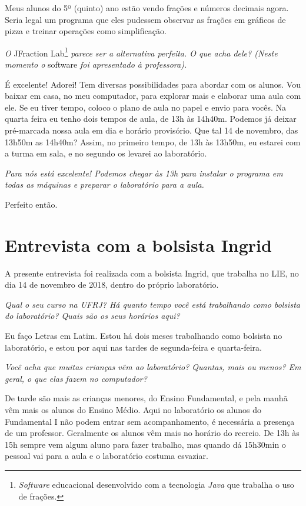 Meus alunos do 5º (quinto) ano estão vendo frações e números decimais agora. Seria legal um programa que eles pudessem observar as frações em gráficos de pizza e treinar operações como simplificação.

\textit{O} JFraction Lab\footnote{\textit{Software} educacional desenvolvido com a tecnologia \textit{Java} que trabalha o uso de frações.} \textit{parece ser a alternativa perfeita. O que acha dele? (Neste momento o} software \textit{foi apresentado à professora).}

É excelente! Adorei! Tem diversas possibilidades para abordar com os alunos. Vou baixar em casa, no meu computador, para explorar mais e elaborar uma aula com ele. Se eu tiver tempo, coloco o plano de aula no papel e envio para vocês. Na quarta feira eu tenho dois tempos de aula, de 13h às 14h40m. Podemos já deixar pré-marcada nossa aula em dia e horário provisório. Que tal 14 de novembro, das 13h50m as 14h40m? Assim, no primeiro tempo, de 13h às 13h50m, eu estarei com a turma em sala, e no segundo os levarei ao laboratório.

\textit{Para nós está excelente! Podemos chegar às 13h para instalar o programa em todas as máquinas e preparar o laboratório para a aula.}

Perfeito então.

\section{Entrevista com a bolsista Ingrid}\label{chp:LABEL_CHP_ENT_SEC_ING}

A presente entrevista foi realizada com a bolsista Ingrid, que trabalha no LIE, no dia 14 de novembro de 2018, dentro do próprio laboratório.

\textit{Qual o seu curso na UFRJ? Há quanto tempo você está trabalhando como bolsista do laboratório? Quais são os seus horários aqui?}

Eu faço Letras em Latim. Estou há dois meses trabalhando como bolsista no laboratório, e estou por aqui nas tardes de segunda-feira e quarta-feira.

\textit{Você acha que muitas crianças vêm ao laboratório? Quantas, mais ou menos? Em geral, o que elas fazem no computador?}

De tarde são mais as crianças menores, do Ensino Fundamental, e pela manhã vêm mais os alunos do Ensino Médio. Aqui no laboratório os alunos do Fundamental I não podem entrar sem acompanhamento, é necessária a presença de um professor. Geralmente os alunos vêm mais no horário do recreio. De 13h às 15h sempre vem algum aluno para fazer trabalho, mas quando dá 15h30min o pessoal vai para a aula e o laboratório costuma esvaziar.


